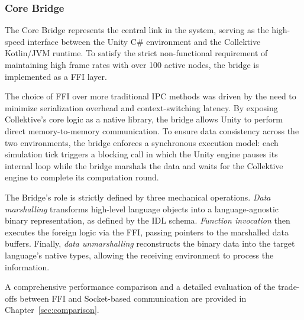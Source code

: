 \subsubsection{Core Bridge}

The Core Bridge represents the central link in the system, serving as the high-speed interface between the Unity C\# environment and the Collektive Kotlin/JVM runtime. To satisfy the strict non-functional requirement of maintaining high frame rates with over 100 active nodes, the bridge is implemented as a \ac{FFI} layer.

The choice of \ac{FFI} over more traditional \ac{IPC} methods was driven by the need to minimize serialization overhead and context-switching latency. By exposing Collektive's core logic as a native library, the bridge allows Unity to perform direct memory-to-memory communication. To ensure data consistency across the two environments, the bridge enforces a synchronous execution model: each simulation tick triggers a blocking call in which the Unity engine pauses its internal loop while the bridge marshals the data and waits for the Collektive engine to complete its computation round.

The Bridge's role is strictly defined by three mechanical operations. \textit{Data marshalling} transforms high-level language objects into a language-agnostic binary representation, as defined by the \ac{IDL} schema. \textit{Function invocation} then executes the foreign logic via the \ac{FFI}, passing pointers to the marshalled data buffers. Finally, \textit{data unmarshalling} reconstructs the binary data into the target language's native types, allowing the receiving environment to process the information.

A comprehensive performance comparison and a detailed evaluation of the trade-offs between \ac{FFI} and Socket-based communication are provided in Chapter~\ref{sec:comparison}.
